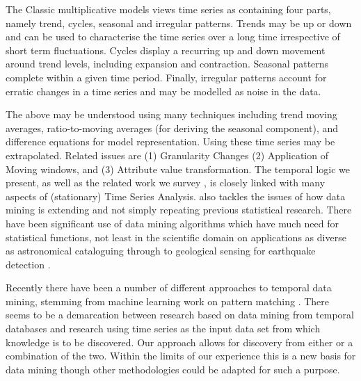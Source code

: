 The Classic multiplicative models views time series as containing four
parts, namely trend, cycles, seasonal and irregular patterns.
Trends may be up or down and can be used to characterise the time
series over a long time irrespective of short term fluctuations.
Cycles display a recurring up and down movement around trend levels,
including expansion and contraction. Seasonal patterns complete within
a given time period. Finally, irregular patterns account for erratic
changes in a time series and may be modelled as noise in the data.
\smallskip

The above may be understood using many techniques including trend moving averages, ratio-to-moving averages (for deriving
the seasonal component), and difference equations for model
representation. Using these time series may be extrapolated.
Related issues are (1) Granularity Changes (2) Application of Moving
windows, and (3) Attribute value transformation. The temporal logic we
present, as well as the related work we survey
\cite{frm94,lai93,alss95,dgm97,dlm98}, is closely linked with many
aspects of (stationary) Time Series Analysis. \cite{gmp97} also
tackles the issues of how data mining is extending and not simply
repeating previous statistical research. There have been significant
use of data mining algorithms which have much need for statistical
functions, not least in the scientific domain on applications as
diverse as astronomical cataloguing through to geological sensing for
earthquake detection \cite{fhs96}.

\medskip

Recently there have been a number of different approaches to temporal
data mining, stemming from machine learning work on pattern
matching \cite{lai93,alss95}. There seems to be a demarcation between research based on
data mining from temporal databases and research using time series as
the input data set from which knowledge is to be discovered. Our
approach allows for discovery from either or a combination of the
two. Within the limits of our experience this is a new basis for data
mining though other methodologies could be
adapted for such a purpose.

\medskip

